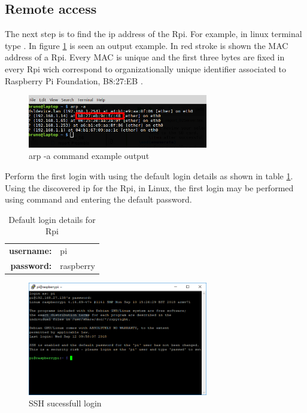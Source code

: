 \subsection{Remote access}
The next step is to find the ip address of the \gls{Rpi}. For example, in linux terminal type . In figure \ref{arp_example} is seen an output example. In red stroke is shown the \gls{MAC} address of a \gls{Rpi}. Every \gls{MAC} is unique and the first three bytes are fixed in every \gls{Rpi} wich correspond to organizationally unique identifier \cite{mac_wiki} associated to Raspberry Pi Foundation, B8:27:EB \cite{wireshark_mac}.

\begin{figure}[hb]
	\centering
	\includegraphics[width=0.7\textwidth]{figures/arp_example}
	\caption{arp -a command example output}
	\label{arp_example}
\end{figure}

Perform the first login with using the default login details as shown in table \ref{tab:default_login}.
Using the discovered ip for the \gls{Rpi}, in Linux, the first login  may be performed using  command and entering the default password.
\begin{table}[h]
	\centering
	\begin{tabular}{rl}
		\toprule
		\textbf{username:}& pi\\
		\textbf{password:}& raspberry\\
		\bottomrule
	\end{tabular}
	\caption{Default login details for \gls{Rpi}}
	\label{tab:default_login}
\end{table}

\begin{figure}[hb]
	\centering
	\includegraphics[width=0.7\textwidth]{figures/ssh_sucessfull.png}
	\caption{SSH sucessfull login}
	\label{fig:ssh_successfull}
\end{figure}

